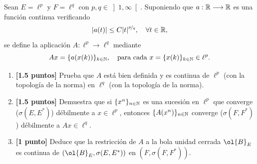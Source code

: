 \documentclass[12pt]{article}
\begin{document}
    \begin{ejercicio}[4 puntos]
        Sean $E = \ell^p$ y $F = \ell^q$ con $p, q \in \left]1, \infty\right[$. Suponiendo que $a : \mathbb{R} \longrightarrow \mathbb{R}$ es una función continua verificando
        \[ |a(t)| \leq C|t|^{\nicefrac{p}{q}}, \quad \forall t \in \mathbb{R}, \]
        se define la aplicación $A : \ell^p \longrightarrow \ell^q$ mediante
        \[ Ax = \{a(x(k))\}_{k \in \mathbb{N}}, \quad \text{para cada } x = \{x(k)\}_{k \in \mathbb{N}} \in \ell^p. \]
        \begin{enumerate}[label=\textbf{\alph*)}]
            \item \textbf{[1.5 puntos]} Prueba que $A$ está bien definida y es continua de $\ell^p$ (con la topología de la norma) en $\ell^q$ (con la topología de la norma).
            \item \textbf{[1.5 puntos]} Demuestra que si $\{x^n\}_{n \in \mathbb{N}}$ es una sucesión en $\ell^p$ que converge ($\sigma(E, E^*)$) débilmente a $x \in \ell^p$, entonces $\{A(x^n)\}_{n \in \mathbb{N}}$ converge ($\sigma(F, F^*)$) débilmente a $Ax \in \ell^q$.
            \item \textbf{[1 punto]} Deduce que la restricción de $A$ a la bola unidad cerrada $\ol{B}_E$ es continua de $(\ol{B}_E, \sigma(E, E^*))$ en $(F, \sigma(F, F^*))$.
        \end{enumerate}
    \end{ejercicio}
\end{document}
